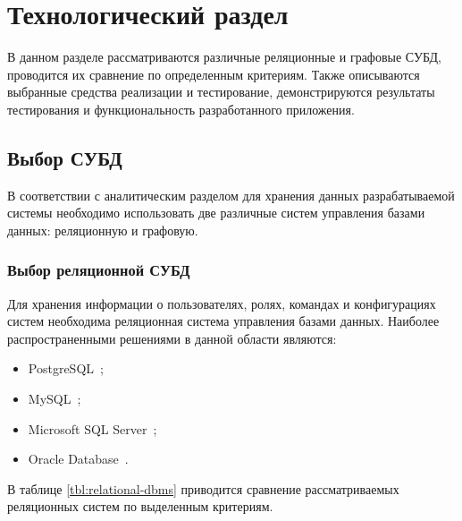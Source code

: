 \section{Технологический раздел}
В данном разделе рассматриваются различные реляционные и 
графовые СУБД, проводится их сравнение по определенным критериям.
Также описываются выбранные средства реализации и тестирование, 
демонстрируются результаты тестирования и функциональность разработанного
приложения.

\subsection{Выбор СУБД}
В соответствии с аналитическим разделом для хранения данных разрабатываемой 
системы необходимо использовать две различные систем управления базами 
данных: реляционную и графовую.

\subsubsection{Выбор реляционной СУБД}
Для хранения информации о пользователях, ролях, командах и конфигурациях 
систем необходима реляционная система управления базами данных. Наиболее 
распространенными решениями в данной области являются:
\begin{itemize}
    \item PostgreSQL~\cite{ref:pg};
    \item MySQL~\cite{ref:mysql};
    \item Microsoft SQL Server~\cite{ref:mssql};
    \item Oracle Database~\cite{ref:oracle-db}.
\end{itemize}

В таблице \ref{tbl:relational-dbms} приводится сравнение рассматриваемых 
реляционных систем по выделенным критериям.

